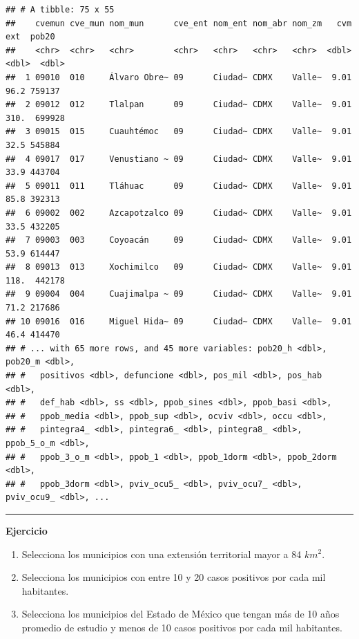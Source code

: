 \documentclass[
  11pt,
  oneside]{book}
\begin{document}
\begin{verbatim}
## # A tibble: 75 x 55
##    cvemun cve_mun nom_mun      cve_ent nom_ent nom_abr nom_zm   cvm   ext  pob20
##    <chr>  <chr>   <chr>        <chr>   <chr>   <chr>   <chr>  <dbl> <dbl>  <dbl>
##  1 09010  010     Álvaro Obre~ 09      Ciudad~ CDMX    Valle~  9.01  96.2 759137
##  2 09012  012     Tlalpan      09      Ciudad~ CDMX    Valle~  9.01 310.  699928
##  3 09015  015     Cuauhtémoc   09      Ciudad~ CDMX    Valle~  9.01  32.5 545884
##  4 09017  017     Venustiano ~ 09      Ciudad~ CDMX    Valle~  9.01  33.9 443704
##  5 09011  011     Tláhuac      09      Ciudad~ CDMX    Valle~  9.01  85.8 392313
##  6 09002  002     Azcapotzalco 09      Ciudad~ CDMX    Valle~  9.01  33.5 432205
##  7 09003  003     Coyoacán     09      Ciudad~ CDMX    Valle~  9.01  53.9 614447
##  8 09013  013     Xochimilco   09      Ciudad~ CDMX    Valle~  9.01 118.  442178
##  9 09004  004     Cuajimalpa ~ 09      Ciudad~ CDMX    Valle~  9.01  71.2 217686
## 10 09016  016     Miguel Hida~ 09      Ciudad~ CDMX    Valle~  9.01  46.4 414470
## # ... with 65 more rows, and 45 more variables: pob20_h <dbl>, pob20_m <dbl>,
## #   positivos <dbl>, defuncione <dbl>, pos_mil <dbl>, pos_hab <dbl>,
## #   def_hab <dbl>, ss <dbl>, ppob_sines <dbl>, ppob_basi <dbl>,
## #   ppob_media <dbl>, ppob_sup <dbl>, ocviv <dbl>, occu <dbl>,
## #   pintegra4_ <dbl>, pintegra6_ <dbl>, pintegra8_ <dbl>, ppob_5_o_m <dbl>,
## #   ppob_3_o_m <dbl>, ppob_1 <dbl>, ppob_1dorm <dbl>, ppob_2dorm <dbl>,
## #   ppob_3dorm <dbl>, pviv_ocu5_ <dbl>, pviv_ocu7_ <dbl>, pviv_ocu9_ <dbl>, ...
\end{verbatim}

\begin{center}\rule{0.5\linewidth}{0.5pt}\end{center}

\textbf{Ejercicio}

\begin{enumerate}
\def\labelenumi{\roman{enumi})}
\item
  Selecciona los municipios con una extensión territorial mayor a 84 \(km^2\).\\
\item
  Selecciona los municipios con entre 10 y 20 casos positivos por cada mil habitantes.\\
\item
  Selecciona los municipios del Estado de México que tengan más de 10 años promedio de estudio y menos de 10 casos positivos por cada mil habitantes.
\end{enumerate}
\end{document}
